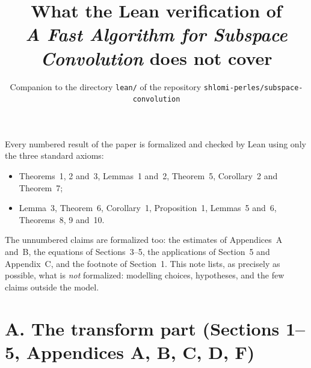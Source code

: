 \documentclass[11pt]{article}
\title{What the Lean verification of\\ \emph{A Fast Algorithm for Subspace Convolution}
does not cover}
\author{Companion to the directory \texttt{lean/} of the repository
\texttt{shlomi-perles/subspace-convolution}}
\date{}
\begin{document}
\maketitle

\noindent
Every numbered result of the paper is formalized and checked by Lean using only the three standard
axioms:
\begin{itemize}
  \item Theorems~1, 2 and~3, Lemmas~1 and~2, Theorem~5, Corollary~2 and
    Theorem~7;
  \item Lemma~3, Theorem~6, Corollary~1, Proposition~1, Lemmas~5 and~6,
    Theorems~8, 9 and~10.
\end{itemize}
The unnumbered claims are formalized too: the estimates of Appendices~A and~B, the equations of
Sections~3--5, the applications of Section~5 and Appendix~C, and the footnote of Section~1.
This note lists, as precisely as possible, what is \emph{not} formalized: modelling choices,
hypotheses, and the few claims outside the model.

\section*{A. The transform part (Sections 1--5, Appendices A, B, C, D, F)}
\end{document}
